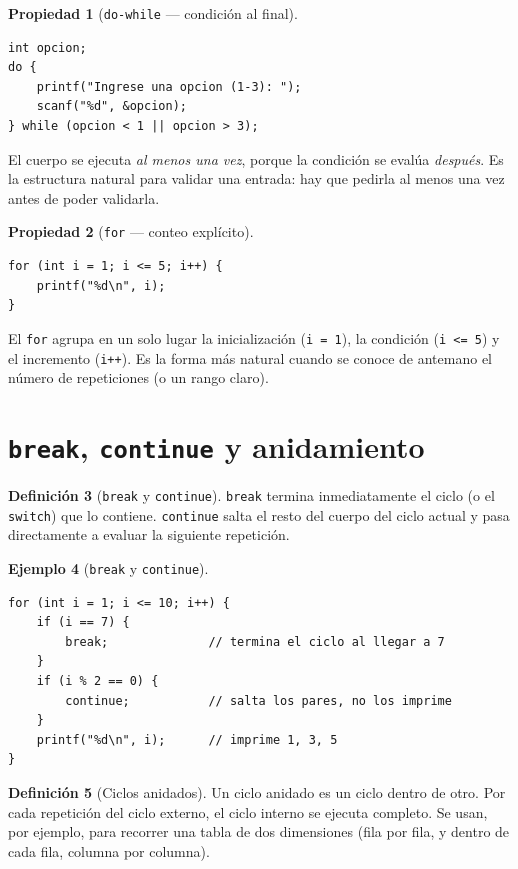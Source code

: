 \documentclass[11pt,letterpaper]{article}
\theoremstyle{definition}
\newtheorem{definicion}{Definición}[section]
\newtheorem{ejemplo}[definicion]{Ejemplo}
\newtheorem{propiedad}[definicion]{Propiedad}
\begin{document}
\begin{propiedad}[\texttt{do-while} --- condición al final]
\begin{lstlisting}
int opcion;
do {
    printf("Ingrese una opcion (1-3): ");
    scanf("%d", &opcion);
} while (opcion < 1 || opcion > 3);
\end{lstlisting}
El cuerpo se ejecuta \emph{al menos una vez}, porque la condición se evalúa \emph{después}. Es la
estructura natural para validar una entrada: hay que pedirla al menos una vez antes de poder
validarla.
\end{propiedad}

\begin{propiedad}[\texttt{for} --- conteo explícito]
\begin{lstlisting}
for (int i = 1; i <= 5; i++) {
    printf("%d\n", i);
}
\end{lstlisting}
El \texttt{for} agrupa en un solo lugar la inicialización (\texttt{i = 1}), la condición
(\texttt{i <= 5}) y el incremento (\texttt{i++}). Es la forma más natural cuando se conoce de
antemano el número de repeticiones (o un rango claro).
\end{propiedad}

\section{\texttt{break}, \texttt{continue} y anidamiento}

\begin{definicion}[\texttt{break} y \texttt{continue}]
\texttt{break} termina inmediatamente el ciclo (o el \texttt{switch}) que lo contiene.
\texttt{continue} salta el resto del cuerpo del ciclo actual y pasa directamente a evaluar la
siguiente repetición.
\end{definicion}

\begin{ejemplo}[\texttt{break} y \texttt{continue}]
\begin{lstlisting}
for (int i = 1; i <= 10; i++) {
    if (i == 7) {
        break;              // termina el ciclo al llegar a 7
    }
    if (i % 2 == 0) {
        continue;           // salta los pares, no los imprime
    }
    printf("%d\n", i);      // imprime 1, 3, 5
}
\end{lstlisting}
\end{ejemplo}

\begin{definicion}[Ciclos anidados]
Un ciclo anidado es un ciclo dentro de otro. Por cada repetición del ciclo externo, el ciclo
interno se ejecuta completo. Se usan, por ejemplo, para recorrer una tabla de dos dimensiones (fila
por fila, y dentro de cada fila, columna por columna).
\end{definicion}
\end{document}

